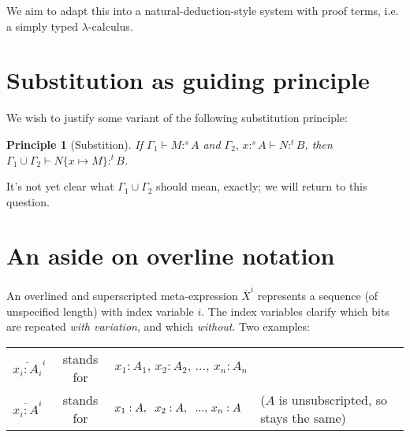 \documentclass{article}
\newtheorem{principle}{Principle}
\newcommand{\todo}[1]{{\color{red}#1}}
\newcommand{\GG}{\Gamma}
\newcommand{\sub}[1]{\{{#1}\}}
\newcommand{\h}[3]{#1 :^{#3}\! {#2}}
\begin{document}
We aim to adapt this into a natural-deduction-style system with proof terms,
i.e.\! a simply typed $\lambda$-calculus.


\section{Substitution as guiding principle}

We wish to justify some variant of the following substitution principle:

\begin{principle}[Substition]
  If $\GG_1 \vdash \h{M}{A}{s}$ and $\GG_2,\, \h{x}{A}{s} \vdash \h{N}{B}{t}$,
  then \(\GG_1 \cup \GG_2 \vdash \h{N\sub{x \mapsto M}}{B}{t}\).
\end{principle}

It's not yet clear what $\GG_1 \cup \GG_2$ should mean, exactly; \todo{we will
  return to this question.}


\section{An aside on overline notation}

\newcommand{\xbar}[2]{\overline{#2}^{#1}}

An overlined and superscripted meta-expression $\xbar{i}{X}$ represents a
sequence (of unspecified length) with index variable $i$. The index variables
clarify which bits are repeated \emph{with variation}, and which \emph{without}.
Two examples:

\begin{center}
  \begin{tabular}{lcll}
    $\xbar{i}{x_i : A_i}$ & stands for
    & $x_1 : A_1,\, x_2 : A_2,\, ...,\, x_n : A_n$
    \\
    $\xbar{i}{x_i : A}$ & stands for
    & $x_1 : A,\hspace{0.6em} x_2 : A,\hspace{0.6em} ...,\, x_n : A$
    & ($A$ is unsubscripted, so stays the same)
  \end{tabular}
\end{center}
\end{document}
